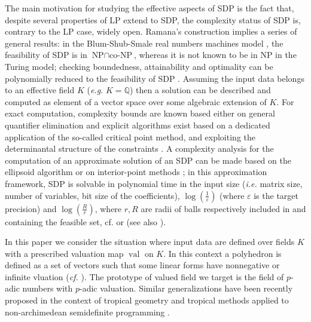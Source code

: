 \documentclass[a4paper,oneside,10pt]{article}
\newcommand{\todo}[1]{{\color{blue}\bf \text{TODO: } #1}} %
\DeclareMathOperator{\val}{val}
\def\QQ{\ensuremath{\mathbb{Q}}}
\begin{document}
The main motivation for studying the effective aspects of SDP is the fact that, despite several properties of LP extend to SDP, the complexity status of SDP is, contrary to the LP case, widely open. Ramana's construction \cite{ramana1997exact} implies a series of general results: in the Blum-Shub-Smale real numbers machines model \cite{blum1989theory}, the feasibility of SDP is in $\text{NP} \cap \text{co-NP}$, whereas it is not known to be in NP in the Turing model; checking boundedness, attainability and optimality can be polynomially reduced to the feasibility of SDP \cite{ramana1997exact}. Assuming the input data belongs to an effective field $K$ (\emph{e.g.} $K = \QQ$) then a solution can be described and computed as element of a vector space over some algebraic extension of $K$. For exact computation, complexity bounds are known based either on general quantifier elimination \cite{ramana1997exact,porkolab1997complexity} and explicit algorithms exist based on a dedicated application of the so-called critical point method, and exploiting the determinantal structure of the constraints \cite{henrion2016exact,NALDI2018206}. A complexity analysis for the computation of an approximate solution of an SDP can be made based on the ellipsoid algorithm \cite{khachiyan1979polynomial,grotschel1981ellipsoid} or on interior-point methods \cite{de2016turing}; in this approximation framework, SDP is solvable in polynomial time in the input size (\emph{i.e.} matrix size, number of variables, bit size of the coefficients), $\log(\frac{1}{\varepsilon})$ (where $\varepsilon$ is the target precision) and $\log(\frac{R}{r})$, where $r,R$ are radii of balls respectively included in and containing the feasible set, cf. \cite{grotschel1981ellipsoid} or \cite[Thm.1.1]{de2016turing} (see also \cite[Sec.1.9]{deKlerk}).

In this paper we consider the situation where input data are defined over fields $K$ with a prescribed valuation map $\val$ on $K$. In this context a polyhedron is defined as a set of vectors such that some linear forms have nonnegative or infinite vluation ({\it cf.} ). The prototype of valued field we target is the field of $p$-adic numbers with $p$-adic valuation.
Similar generalizations have been recently proposed in the context of tropical geometry \cite{iriarte2022polyhedral} and tropical methods applied to non-archimedean semidefinite programming \cite{allamigeon2016solving,allamigeon_tropical_2020}.
\end{document}
